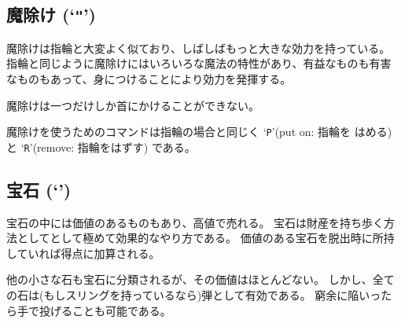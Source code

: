 \subsection*{魔除け (`{\tt "}')}

魔除けは指輪と大変よく似ており、しばしばもっと大きな効力を持っている。
指輪と同じように魔除けにはいろいろな魔法の特性があり、有益なものも有害
なものもあって、身につけることにより効力を発揮する。

魔除けは一つだけしか首にかけることができない。

魔除けを使うためのコマンドは指輪の場合と同じく `{\tt P}'(put on: 指輪を
はめる) と `{\tt R}'(remove: 指輪をはずす) である。

\subsection*{宝石 (`{\tt *}')}

宝石の中には価値のあるものもあり、高値で売れる。
宝石は財産を持ち歩く方法としてとして極めて効果的なやり方である。
価値のある宝石を脱出時に所持していれば得点に加算される。

他の小さな石も宝石に分類されるが、その価値はほとんどない。
しかし、全ての石は(もしスリングを持っているなら)弾として有効である。
窮余に陥いったら手で投げることも可能である。

